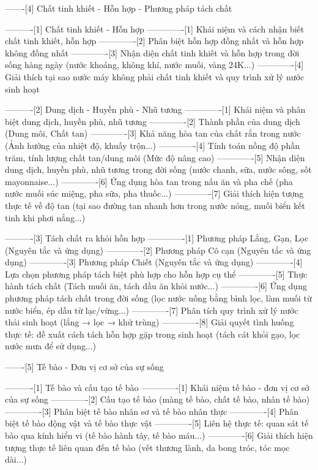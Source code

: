 -------[4] Chất tinh khiết - Hỗn hợp - Phương pháp tách chất

----------[1] Chất tinh khiết - Hỗn hợp
-------------[1] Khái niệm và cách nhận biết chất tinh khiết, hỗn hợp
-------------[2] Phân biệt hỗn hợp đồng nhất và hỗn hợp không đồng nhất
-------------[3] Nhận diện chất tinh khiết và hỗn hợp trong đời sống hàng ngày (nước khoáng, không khí, nước muối, vàng 24K...)
-------------[4] Giải thích tại sao nước máy không phải chất tinh khiết và quy trình xử lý nước sinh hoạt

----------[2] Dung dịch - Huyền phù - Nhũ tương
-------------[1] Khái niệm và phân biệt dung dịch, huyền phù, nhũ tương
-------------[2] Thành phần của dung dịch (Dung môi, Chất tan)
-------------[3] Khả năng hòa tan của chất rắn trong nước (Ảnh hưởng của nhiệt độ, khuấy trộn...)
-------------[4] Tính toán nồng độ phần trăm, tính lượng chất tan/dung môi (Mức độ nâng cao)
-------------[5] Nhận diện dung dịch, huyền phù, nhũ tương trong đời sống (nước chanh, sữa, nước sông, sốt mayonnaise...)
-------------[6] Ứng dụng hòa tan trong nấu ăn và pha chế (pha nước muối súc miệng, pha sữa, pha thuốc...)
-------------[7] Giải thích hiện tượng thực tế về độ tan (tại sao đường tan nhanh hơn trong nước nóng, muối biển kết tinh khi phơi nắng...)

----------[3] Tách chất ra khỏi hỗn hợp
-------------[1] Phương pháp Lắng, Gạn, Lọc (Nguyên tắc và ứng dụng)
-------------[2] Phương pháp Cô cạn (Nguyên tắc và ứng dụng)
-------------[3] Phương pháp Chiết (Nguyên tắc và ứng dụng)
-------------[4] Lựa chọn phương pháp tách biệt phù hợp cho hỗn hợp cụ thể
-------------[5] Thực hành tách chất (Tách muối ăn, tách dầu ăn khỏi nước...)
-------------[6] Ứng dụng phương pháp tách chất trong đời sống (lọc nước uống bằng bình lọc, làm muối từ nước biển, ép dầu từ lạc/vừng...)
-------------[7] Phân tích quy trình xử lý nước thải sinh hoạt (lắng → lọc → khử trùng)
-------------[8] Giải quyết tình huống thực tế: đề xuất cách tách hỗn hợp gặp trong sinh hoạt (tách cát khỏi gạo, lọc nước mưa để sử dụng...)

-------[5] Tế bào - Đơn vị cơ sở của sự sống

----------[1] Tế bào và cấu tạo tế bào
-------------[1] Khái niệm tế bào - đơn vị cơ sở của sự sống
-------------[2] Cấu tạo tế bào (màng tế bào, chất tế bào, nhân tế bào)
-------------[3] Phân biệt tế bào nhân sơ và tế bào nhân thực
-------------[4] Phân biệt tế bào động vật và tế bào thực vật
-------------[5] Liên hệ thực tế: quan sát tế bào qua kính hiển vi (tế bào hành tây, tế bào máu...)
-------------[6] Giải thích hiện tượng thực tế liên quan đến tế bào (vết thương lành, da bong tróc, tóc mọc dài...)

